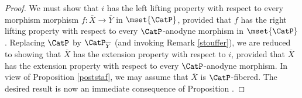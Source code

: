\begin{proof}
We must show that $i$ has the left lifting property with respect to every morphism
morphism $f: \overline{X} \rightarrow \overline{Y}$ in $\mset{ \CatP}$, provided that $f$ has
the right lifting property with respect to every $\CatP$-anodyne morphism in $\mset{ \CatP}$.
Replacing $\CatP$ by $\CatP_{ \overline{Y} }$ (and invoking Remark \ref{stouffer}), we
are reduced to showing that $\overline{X}$ has the extension property with respect to $i$, provided that $\overline{X}$ has the extension property with respect to every $\CatP$-anodyne morphism.
In view of Proposition \ref{poststaf}, we may assume that $\overline{X}$ is $\CatP$-fibered.
The desired result is now an immediate consequence of Proposition .




\end{proof}
